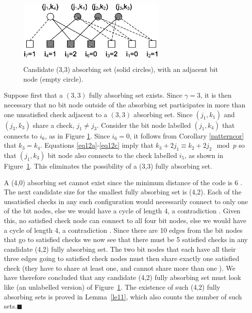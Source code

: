 \begin{figure}
\center\includegraphics[width=2.9in,height=1.35in]{Visio-fig07z.eps}%
\caption{Candidate (3,3) absorbing set (solid circles), with an
adjacent bit node (empty circle).}\label{Fig05a}
\end{figure}

Suppose first that a $(3,3)$ fully absorbing set exists. Since
$\gamma=3$, it is then necessary that no bit node outside of the
absorbing set participates in more than one unsatisfied check
adjacent to a $(3,3)$ absorbing set. Since $(j_1,k_1)$ and
$(j_3,k_3)$ share a check, $j_1 \neq j_3$. Consider the bit node
labelled $(j_1,k_4)$ that connects to $i_6$, as in Figure
\ref{Fig05a}. Since $i_6=0$, it follows from Corollary
\ref{patterncor} that $k_3=k_4$. Equations
\eqref{eq12a}-\eqref{eq12c} imply that $k_3+2j_1 \equiv k_2+2j_2
\mod p$ so that $(j_1,k_3)$ bit node also connects to the check
labelled $i_5$, as shown in Figure~\ref{Fig05a}. This eliminates the
possibility of a (3,3) fully absorbing set.

A (4,0) absorbing set cannot exist since the minimum distance of the
code is 6 \cite{helles}. The next candidate size for the smallest
fully absorbing set is (4,2). Each of the unsatisfied checks in any
such configuration would necessarily connect to only one of the bit
nodes, else we would have a cycle of length 4, a contradiction
\cite{fan}. Given this, no satisfied check node can connect to all
four bit nodes, else we would have a cycle of length 4, a
contradiction \cite{fan}. Since there are 10 edges from the bit
nodes that go to satisfied checks we now see that there must be 5
satisfied checks in any candidate (4,2) fully absorbing set. The two
bit nodes that each have all their three edges going to satisfied
check nodes must then share exactly one satisfied check (they have
to share at least one, and cannot share more than one \cite{fan}).
We have therefore concluded that any candidate (4,2) fully absorbing
set must look like (an unlabelled version) of Figure~\ref{Fig05a}.
The existence of such (4,2) fully absorbing sets is proved in
Lemma~\ref{le11}, which also counts the number of such
sets.\hfill$\blacksquare$



